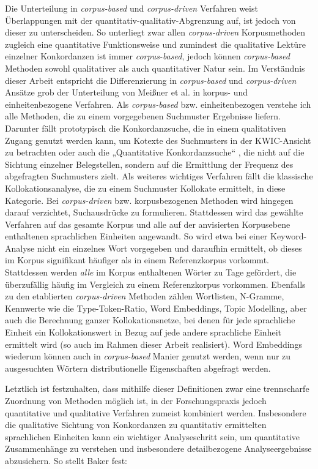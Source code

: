 Die Unterteilung in \emph{corpus-based} und \emph{corpus-driven} Verfahren weist Überlappungen mit der quantitativ-qualitativ-Abgrenzung auf, ist jedoch von dieser zu unterscheiden. So unterliegt zwar allen \emph{corpus-driven} Korpusmethoden zugleich eine quantitative Funktionsweise und zumindest die qualitative Lektüre einzelner Konkordanzen ist immer \emph{corpus-based}, jedoch können \emph{corpus-based} Methoden sowohl qualitativer als auch quantitativer Natur sein. Im Verständnis dieser Arbeit entspricht die Differenzierung in \emph{corpus-based} und \emph{corpus-driven} Ansätze grob der Unterteilung von Meißner et al. in korpus- und einheitenbezogene Verfahren. Als \emph{corpus-based} bzw. einheitenbezogen verstehe ich alle Methoden, die zu einem vorgegebenen Suchmuster Ergebnisse liefern. Darunter fällt prototypisch die Konkordanzsuche, die in einem qualitativen Zugang genutzt werden kann, um Kotexte des Suchmusters in der KWIC-Ansicht zu betrachten oder auch die „Quantitative Konkordanzsuche`` \autocite[311]{meissnerKorpusanalyse2016}, die nicht auf die Sichtung einzelner Belegstellen, sondern auf die Ermittlung der Frequenz des abgefragten Suchmusters zielt. Als weiteres wichtiges Verfahren fällt die klassische Kollokationsanalyse, die zu einem Suchmuster Kollokate ermittelt, in diese Kategorie. Bei \emph{corpus-driven} bzw. korpusbezogenen Methoden wird hingegen darauf verzichtet, Suchausdrücke zu formulieren. Stattdessen wird das gewählte Verfahren auf das gesamte Korpus und alle auf der anvisierten Korpusebene enthaltenen sprachlichen Einheiten angewandt. So wird etwa bei einer Keyword-Analyse nicht ein einzelnes Wort vorgegeben und daraufhin ermittelt, ob dieses im Korpus signifikant häufiger als in einem Referenzkorpus vorkommt. Stattdessen werden \emph{alle} im Korpus enthaltenen Wörter zu Tage gefördert, die überzufällig häufig im Vergleich zu einem Referenzkorpus vorkommen. Ebenfalls zu den etablierten \emph{corpus-driven} Methoden zählen Wortlisten, N-Gramme, Kennwerte wie die Type-Token-Ratio, Word Embeddings, Topic Modelling, aber auch die Berechnung ganzer Kollokationsnetze, bei denen für jede sprachliche Einheit ein Kollokationswert in Bezug auf jede andere sprachliche Einheit ermittelt wird (so auch im Rahmen dieser Arbeit realisiert). Word Embeddings wiederum können auch in \emph{corpus-based} Manier genutzt werden, wenn nur zu ausgesuchten Wörtern distributionelle Eigenschaften abgefragt werden.

Letztlich ist festzuhalten, dass mithilfe dieser Definitionen zwar eine trennscharfe Zuordnung von Methoden möglich ist, in der Forschungspraxis jedoch quantitative und qualitative Verfahren zumeist kombiniert werden. Insbesondere die qualitative Sichtung von Konkordanzen zu quantitativ ermittelten sprachlichen Einheiten kann ein wichtiger Analyseschritt sein, um quantitative Zusammenhänge zu verstehen und insbesondere detailbezogene Analyseergebnisse abzusichern. So stellt Baker fest:

